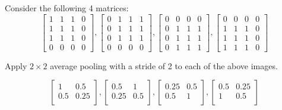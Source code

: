 Consider the following 4 matrices:
$$
\begin{bmatrix}
    1 & 1 & 1 & 0 \\
    1 & 1 & 1 & 0 \\
    1 & 1 & 1 & 0 \\
    0 & 0 & 0 & 0
\end{bmatrix},
%
\begin{bmatrix}
    0 & 1 & 1 & 1 \\
    0 & 1 & 1 & 1 \\
    0 & 1 & 1 & 1 \\
    0 & 0 & 0 & 0
\end{bmatrix},
%
\begin{bmatrix}
	0 & 0 & 0 & 0 \\
    0 & 1 & 1 & 1 \\
    0 & 1 & 1 & 1 \\
    0 & 1 & 1 & 1
\end{bmatrix},
%
\begin{bmatrix}
    0 & 0 & 0 & 0 \\
    1 & 1 & 1 & 0 \\
    1 & 1 & 1 & 0 \\
    1 & 1 & 1 & 0
\end{bmatrix}
$$
\problem[3]

Apply $2 \times 2$ average pooling with a stride of 2 to each of the above images.

\begin{subsolution}
  $$
  \begin{bmatrix}
    1 & 0.5 \\
    0.5 & 0.25 \\
  \end{bmatrix},
  \begin{bmatrix}
    0.5 & 1 \\
    0.25 & 0.5 \\
  \end{bmatrix},
  \begin{bmatrix}
    0.25 & 0.5 \\
    0.5 & 1 \\
  \end{bmatrix},
  \begin{bmatrix}
    0.5 & 0.25 \\
    1 & 0.5 \\
  \end{bmatrix}
  $$
\end{subsolution}

\problem[3]

